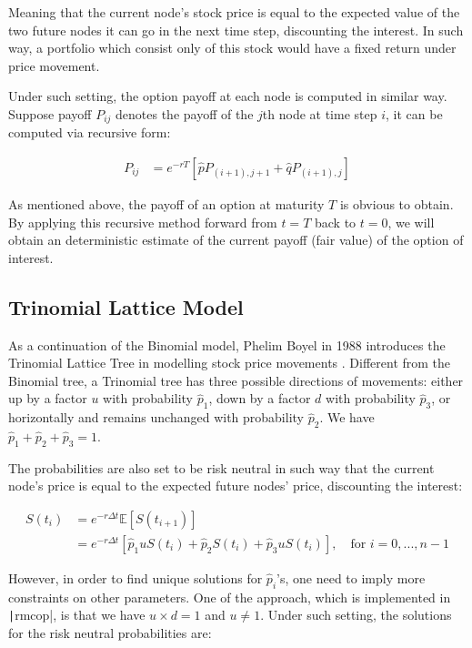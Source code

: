 Meaning that the current node's stock price is equal to the expected value of the two future nodes it can go in the next time step, discounting the interest. In such way, a portfolio which consist only of this stock would have a fixed return under price movement.

Under such setting, the option payoff at each node is computed in similar way. Suppose payoff $P_{ij}$ denotes the payoff of the $j$th node at time step $i$, it can be computed via recursive form:

\begin{align}
P_{ij} &= e^{-rT}[\hat{p}P_{(i+1),j+1} + \hat{q}P_{(i+1),j}]
\end{align}

As mentioned above, the payoff of an option at maturity $T$ is obvious to obtain. By applying this recursive method forward from $t=T$ back to $t=0$, we will obtain an deterministic estimate of the current payoff (fair value) of the option of interest.

\subsection{Trinomial Lattice Model}

As a continuation of the Binomial model, Phelim Boyel in 1988 introduces the Trinomial Lattice Tree in modelling stock price movements \cite{Boyle1988}. Different from the Binomial tree, a Trinomial tree has three possible directions of movements: either up by a factor $u$ with probability $\hat{p}_1$, down by a factor $d$ with probability $\hat{p}_3$, or horizontally and remains unchanged with probability $\hat{p}_2$. We have $\hat{p}_1 + \hat{p}_2 + \hat{p}_3=1$.


The probabilities are also set to be risk neutral in such way that the current node's price is equal to the expected future nodes' price, discounting the interest:

\begin{align}
	S(t_{i}) &= e^{-r\Delta t}\mathbb{E}[S(t_{i+1})] \\
	&= e^{-r\Delta t}[\hat{p}_1uS(t_i)+\hat{p}_2S(t_i)+\hat{p}_3uS(t_i)],\quad\text{for }i=0,...,n-1
\end{align}

However, in order to find unique solutions for $\hat{p}_i$'s, one need to imply more constraints on other parameters. One of the approach, which is implemented in \texttt|rmcop|, is that we have $u\times d=1$ and $u\neq1$. Under such setting, the solutions for the risk neutral probabilities are:

